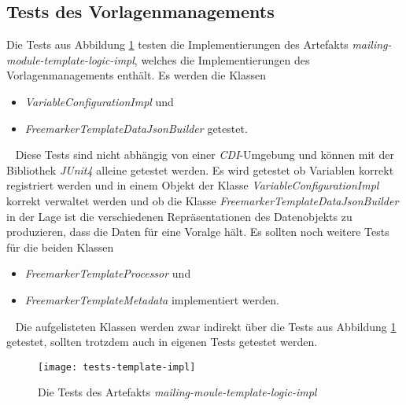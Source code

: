\subsection{Tests des Vorlagenmanagements}
Die Tests aus Abbildung \ref{fig:tests-template-impl} testen die Implementierungen des Artefakts \emph{mailing-module-template-logic-impl}, welches die Implementierungen des Vorlagenmanagements enthält. Es werden die Klassen
\begin{itemize}
	\item \emph{VariableConfigurationImpl} und
	\item \emph{FreemarkerTemplateDataJsonBuilder} getestet.
\end{itemize}
\ \newline
Diese Tests sind nicht abhängig von einer \emph{CDI}-Umgebung und können mit der Bibliothek \emph{JUnit4} alleine getestet werden. Es wird getestet ob Variablen korrekt registriert werden und in einem Objekt der Klasse \emph{VariableConfigurationImpl} korrekt verwaltet werden und ob die Klasse \emph{FreemarkerTemplateDataJsonBuilder} in der Lage ist die verschiedenen Repräsentationen des Datenobjekts zu produzieren, dass die Daten für eine Voralge hält.
\newline
\newline
Es sollten noch weitere Tests für die beiden Klassen 
\begin{itemize}
	\item\emph{FreemarkerTemplateProcessor} und
	\item\emph{FreemarkerTemplateMetadata} implementiert werden.
\end{itemize}
\ \newline
Die aufgelisteten Klassen werden zwar indirekt über die Tests aus Abbildung \ref{fig:tests-template-impl} getestet, sollten trotzdem auch in eigenen Tests getestet werden.
\newpage

\begin{figure}[h]
\centering
\texttt{[image: tests-template-impl]}
\caption{Die Tests des Artefakts \emph{mailing-moule-template-logic-impl}}
\label{fig:tests-template-impl}
\end{figure}

